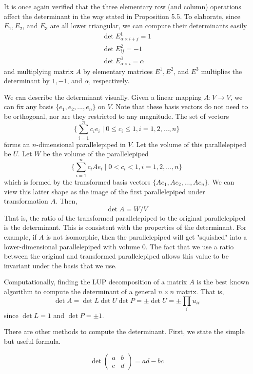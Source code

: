 \documentclass{article}
\begin{document}
  It is once again verified that the three elementary row (and column) operations affect the determinant in the way stated in Proposition 5.5. To elaborate, since $E_1, E_2$, and $E_3$ are all lower triangular, we can compute their determinants easily
  \begin{align*}
      \det{E^1_{\alpha \times i + j}} = 1 \\
      \det{E^2_{i j}} = -1 \\
      \det{E^3_{\alpha \times i}} = \alpha
  \end{align*}
  and multiplying matrix $A$ by elementary matrices $E^1, E^2$, and $E^3$ multiplies the determinant by $1, -1$, and $\alpha$, respectively. 

  We can describe the determinant visually. Given a linear mapping $A: V \longrightarrow V$, we can fix any basis $\{e_1, e_2, ..., e_n\}$ on $V$. Note that these basis vectors do not need to be orthogonal, nor are they restricted to any magnitude. The set of vectors 
  \[\Big\{ \sum_{i=1}^n c_i e_i \; | \; 0 \leq c_i \leq 1, i = 1, 2, ..., n\Big\}\]
  forms an $n$-dimensional parallelepiped in $V$. Let the volume of this parallelepiped be $U$. Let $W$ be the volume of the parallelepiped 
  \[\Big\{ \sum_{i=1}^n c_i A e_i \; | \; 0<c_i<1, i = 1, 2, ..., n\Big\}\]
  which is formed by the transformed basis vectors $\{Ae_1, Ae_2, ..., Ae_n\}$. We can view this latter shape as the image of the first parallelepiped under transformation $A$. Then, 
  \[ \det{A} = W / V \]
  That is, the ratio of the transformed parallelepiped to the original parallelepiped is the determinant. This is consistent with the properties of the determinant. For example, if $A$ is not isomorphic, then the parallelepiped will get "squished" into a lower-dimensional parallelepiped with volume $0$. The fact that we use a ratio between the original and transformed parallelepiped allows this value to be invariant under the basis that we use. 

  Computationally, finding the LUP decomposition of a matrix $A$ is the best known algorithm to compute the determinant of a general $n \times n$ matrix. That is, 
  \[ \det{A} = \det{L} \det{U} \det{P} = \pm \det{U} = \pm \prod_i u_{i i}\]
  since $\det{L} = 1$ and $\det{P} = \pm 1$. 

  There are other methods to compute the determinant. First, we state the simple but useful formula.

  \begin{proposition}
  \[\det{\begin{pmatrix}
  a&b\\c&d 
  \end{pmatrix}} = a d - b c\] 
  \end{proposition}
\end{document}
